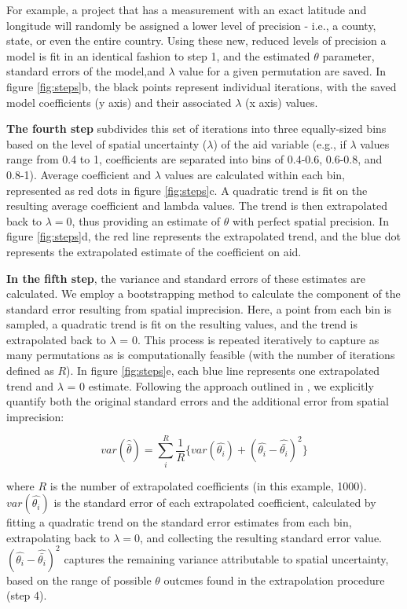 For example, a project that has a measurement with an exact latitude and longitude will randomly be assigned a lower level of precision - i.e., a county, state, or even the entire country. 
Using these new, reduced levels of precision a model is fit in an identical fashion to step 1, and the estimated $\theta$ parameter, standard errors of the model,and $\lambda$ value for a given permutation are saved.
In figure \ref{fig:steps}b, the black points represent individual iterations, with the saved model coefficients (y axis) and their associated $\lambda$ (x axis) values. 
\par
\textbf{The fourth step} subdivides this set of iterations into three equally-sized bins based on the level of spatial uncertainty ($\lambda$) of the aid variable (e.g., if $\lambda$ values range from 0.4 to 1, coefficients are separated into bins of 0.4-0.6, 0.6-0.8, and 0.8-1). 
Average coefficient and $\lambda$ values are calculated within each bin, represented as red dots in figure \ref{fig:steps}c. 
A quadratic trend is fit on the resulting average coefficient and lambda values. 
The trend is then extrapolated back to $\lambda=0$, thus providing an estimate of $\theta$ with perfect spatial precision. 
In figure \ref{fig:steps}d, the red line represents the extrapolated trend, and the blue dot represents the extrapolated estimate of the coefficient on aid. 
\par 

\textbf{In the fifth step}, the variance and standard errors of these estimates are calculated. 
We employ a bootstrapping method to calculate the component of the standard error resulting from spatial imprecision. Here, a point from each bin is sampled, a quadratic trend is fit on the resulting values, and the trend is extrapolated back to $\lambda$ = 0. 
This process is repeated iteratively to capture as many permutations as is computationally feasible (with the number of iterations defined as $R$). 
In figure \ref{fig:steps}e, each blue line represents one extrapolated trend and $\lambda$ = 0 estimate. 
Following the approach outlined in \cite{burnham_information_2002}, we explicitly quantify both the original standard errors and the additional error from spatial imprecision:

\begin{equation}\label{variance}
var(\hat{\bar{\theta}}) = \sum_i^R \frac{1}{R} \{ var(\hat{\theta_i}) + (\hat{\theta_i}-\hat{\bar{\theta_i}})^2 \}
\end{equation}

\noindent where $R$ is the number of extrapolated coefficients (in this example, 1000). 
$var(\hat{\theta_i})$ is the standard error of each extrapolated coefficient, calculated by fitting a quadratic trend on the standard error estimates from each bin, extrapolating back to $\lambda=0$, and collecting the resulting standard error value. 
$(\hat{\theta_i}-\hat{\bar{\theta_i}})^2$ captures the remaining variance attributable to spatial uncertainty, based on the range of possible $\theta$ outcmes found in the extrapolation procedure (step 4).  

